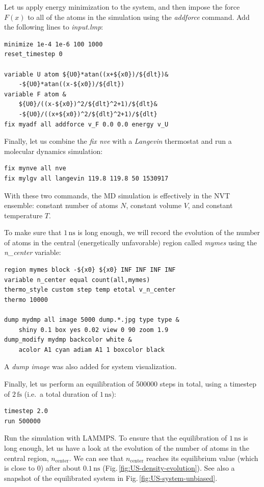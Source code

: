 \documentclass[9pt,tutorial]{livecoms}
\begin{document}
Let us apply energy minimization to the system, and then impose the force $F(x)$
to all of the atoms in the simulation using the \textit{addforce} command. Add
the following lines to \textit{input.lmp}:
\begin{lstlisting}
minimize 1e-4 1e-6 100 1000
reset_timestep 0

variable U atom ${U0}*atan((x+${x0})/${dlt})&
    -${U0}*atan((x-${x0})/${dlt})
variable F atom &
    ${U0}/((x-${x0})^2/${dlt}^2+1)/${dlt}&
    -${U0}/((x+${x0})^2/${dlt}^2+1)/${dlt}
fix myadf all addforce v_F 0.0 0.0 energy v_U
\end{lstlisting}
Finally, let us combine the \textit{fix nve} with a \textit{Langevin} thermostat
and run a molecular dynamics simulation:
\begin{lstlisting}
fix mynve all nve
fix mylgv all langevin 119.8 119.8 50 1530917
\end{lstlisting}
With these two commands, the MD simulation
is effectively in the NVT ensemble: constant number of atoms $N$, constant volume
$V$, and constant temperature $T$.

To make sure that $1\,\text{ns}$ is long enough, we will record the evolution of
the number of atoms in the central (energetically unfavorable) region called \textit{mymes}
using the \textit{n\_center} variable:
\begin{lstlisting}
region mymes block -${x0} ${x0} INF INF INF INF
variable n_center equal count(all,mymes)
thermo_style custom step temp etotal v_n_center
thermo 10000

dump mydmp all image 5000 dump.*.jpg type type &
    shiny 0.1 box yes 0.02 view 0 90 zoom 1.9
dump_modify mydmp backcolor white &
    acolor A1 cyan adiam A1 1 boxcolor black
\end{lstlisting}
A \textit{dump image} was also added for system visualization.

Finally, let us perform an equilibration of 500000 steps
in total, using a timestep of $2\,\text{fs}$ (i.e.~a total duration of $1\,\text{ns}$):
\begin{lstlisting}
timestep 2.0
run 500000
\end{lstlisting}
Run the simulation with LAMMPS. To ensure that the equilibration of $1\,\text{ns}$ is long
enough, let us have a look at the evolution of the number of atoms in the central region,
$n_\mathrm{center}$. We can see that $n_\mathrm{center}$ reaches
its equilibrium value (which is close to 0) after about $0.1\,\text{ns}$
(Fig.\,\ref{fig:US-density-evolution}). See also a snapshot of the equilibrated
system in Fig.\,\ref{fig:US-system-unbiased}.
\end{document}
